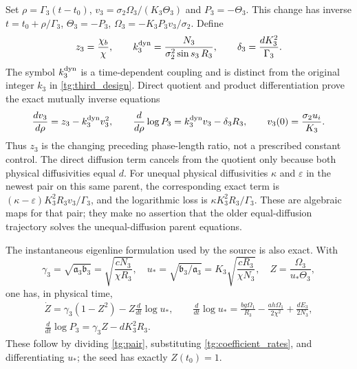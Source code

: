 Set $\rho=\Gamma_3(t-t_0)$,
$v_3=\sigma_2\Omega_3/(K_3\Theta_3)$ and
$P_3=-\Theta_3$. This change has inverse
$t=t_0+\rho/\Gamma_3$, $\Theta_3=-P_3$,
$\Omega_3=-K_3P_3v_3/\sigma_2$. Define
\begin{equation}\label{tg:quotient_coefficients}
 z_3=\frac{\chi_b}{\chi},\qquad
 k_3^{\rm dyn}=\frac{N_3}{\sigma_2^2\sin s_3\,R_3},\qquad
 \delta_3=\frac{dK_3^2}{\Gamma_3}.
\end{equation}
The symbol $k_3^{\rm dyn}$ is a time-dependent coupling and is
distinct from the original integer $k_3$ in \eqref{tg:third_design}.
Direct quotient and product differentiation prove the exact mutually
inverse equations
\begin{equation}\label{tg:quotient}
 \frac{dv_3}{d\rho}=z_3-k_3^{\rm dyn}v_3^2,\qquad
 \frac{d}{d\rho}\log P_3=k_3^{\rm dyn}v_3-\delta_3R_3,
 \qquad
 v_3(0)=\frac{\sigma_2u_i}{K_3}.
\end{equation}
Thus $z_3$ is the changing preceding phase-length ratio, not a
prescribed constant control. The direct diffusion term cancels from
the quotient only because both physical diffusivities equal $d$.
For unequal physical diffusivities $\kappa$ and $\varepsilon$ in
the newest pair on this same parent, the corresponding exact term
is $(\kappa-\varepsilon)K_3^2R_3v_3/\Gamma_3$, and the logarithmic
loss is $\kappa K_3^2R_3/\Gamma_3$. These are algebraic maps for
that pair; they make no assertion that the older equal-diffusion
trajectory solves the unequal-diffusion parent equations.

The instantaneous eigenline formulation used by the source is also
exact. With
\[
 \gamma_3=\sqrt{\mathfrak a_3\mathfrak b_3}
          =\sqrt{\frac{cN_3}{\chi R_3}},\quad
 u_* =\sqrt{\mathfrak b_3/\mathfrak a_3}
          =K_3\sqrt{\frac{cR_3}{\chi N_3}},\quad
 Z=\frac{\Omega_3}{u_*\Theta_3},
\]
one has, in physical time,
\begin{equation}\label{tg:eigenline}
\begin{gathered}
 \dot Z=\gamma_3(1-Z^2)-Z\frac d{dt}\log u_*,
 \qquad
 \frac d{dt}\log u_*
    =\frac{bg\Omega_1}{R_3}
       -\frac{ah\Omega_1}{2\chi^2}+\frac{dE_3}{2N_3},\\
 \frac d{dt}\log P_3=\gamma_3Z-dK_3^2R_3.
\end{gathered}
\end{equation}
These follow by dividing \eqref{tg:pair}, substituting
\eqref{tg:coefficient_rates}, and differentiating $u_*$; the seed
has exactly $Z(t_0)=1$.

